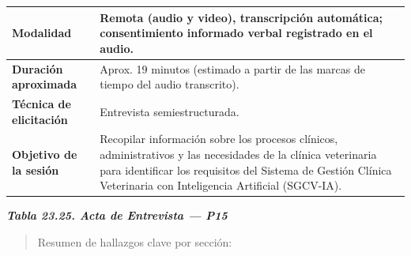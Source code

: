 \documentclass[
]{article}
\begin{document}
{\begin{longtable}[]{|
  >{\raggedright\arraybackslash}p{}|
  >{\raggedright\arraybackslash}p{}|}
\hline
\textbf{Modalidad} & \begin{minipage}[t]{\linewidth}\raggedright
Remota (audio y video), transcripción automática; consentimiento informado verbal registrado en el audio.
\end{minipage} \\
\hline
\textbf{Duración aproximada} & \begin{minipage}[t]{\linewidth}\raggedright
Aprox. 19 minutos (estimado a partir de las marcas de tiempo del audio transcrito).
\end{minipage} \\
\hline
\textbf{Técnica de elicitación} & \begin{minipage}[t]{\linewidth}\raggedright
Entrevista semiestructurada.
\end{minipage} \\
\hline
\textbf{Objetivo de la sesión} & \begin{minipage}[t]{\linewidth}\raggedright
Recopilar información sobre los procesos clínicos, administrativos y las necesidades de la clínica veterinaria para identificar los requisitos del Sistema de Gestión Clínica Veterinaria con Inteligencia Artificial (SGCV-IA).
\end{minipage} \\
\hline
\end{longtable}
}

\protect{}\label{_bookmark_P15_acta}{}\emph{\textbf{Tabla 23.25. Acta de Entrevista --- P15}}

\begin{quote}
Resumen de hallazgos clave por sección:
\end{quote}
\end{document}
